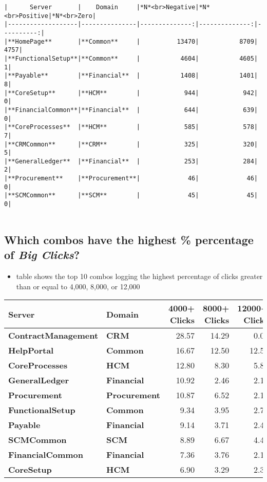\documentclass[11pt]{article}
\providecommand{\tightlist}{%
      \setlength{\itemsep}{0pt}\setlength{\parskip}{0pt}}
\begin{document}
    \begin{Verbatim}[commandchars=\\\{\}]
|      Server       |    Domain     |*N*<br>Negative|*N*<br>Positive|*N*<br>Zero|
|-------------------|---------------|--------------:|--------------:|----------:|
|**HomePage**       |**Common**     |          13470|           8709|       4757|
|**FunctionalSetup**|**Common**     |           4604|           4605|          1|
|**Payable**        |**Financial**  |           1408|           1401|          8|
|**CoreSetup**      |**HCM**        |            944|            942|          0|
|**FinancialCommon**|**Financial**  |            644|            639|          0|
|**CoreProcesses**  |**HCM**        |            585|            578|          7|
|**CRMCommon**      |**CRM**        |            325|            320|          5|
|**GeneralLedger**  |**Financial**  |            253|            284|          2|
|**Procurement**    |**Procurement**|             46|             46|          0|
|**SCMCommon**      |**SCM**        |             45|             45|          0|


    \end{Verbatim}

    \hypertarget{which-combos-have-the-highest-percentage-of-big-clicks}{%
\subsection{\texorpdfstring{Which combos have the highest \% percentage
of \emph{Big
Clicks}?}{Which combos have the highest \% percentage of Big Clicks?}}\label{which-combos-have-the-highest-percentage-of-big-clicks}}

\begin{itemize}
\tightlist
\item
  table shows the top 10 combos logging the highest percentage of clicks
  greater than or equal to 4,000, 8,000, or 12,000
\end{itemize}

\begin{longtable}[]{@{}llrrr@{}}
\toprule
Server & Domain & 4000+ Clicks & 8000+ Clicks & 12000+
Clicks\tabularnewline
\midrule
\endhead
\textbf{ContractManagement} & \textbf{CRM} & 28.57 & 14.29 &
0.00\tabularnewline
\textbf{HelpPortal} & \textbf{Common} & 16.67 & 12.50 &
12.50\tabularnewline
\textbf{CoreProcesses} & \textbf{HCM} & 12.80 & 8.30 &
5.88\tabularnewline
\textbf{GeneralLedger} & \textbf{Financial} & 10.92 & 2.46 &
2.11\tabularnewline
\textbf{Procurement} & \textbf{Procurement} & 10.87 & 6.52 &
2.17\tabularnewline
\textbf{FunctionalSetup} & \textbf{Common} & 9.34 & 3.95 &
2.74\tabularnewline
\textbf{Payable} & \textbf{Financial} & 9.14 & 3.71 &
2.43\tabularnewline
\textbf{SCMCommon} & \textbf{SCM} & 8.89 & 6.67 & 4.44\tabularnewline
\textbf{FinancialCommon} & \textbf{Financial} & 7.36 & 3.76 &
2.19\tabularnewline
\textbf{CoreSetup} & \textbf{HCM} & 6.90 & 3.29 & 2.34\tabularnewline
\bottomrule
\end{longtable}


    
    
    
    
\end{document}
